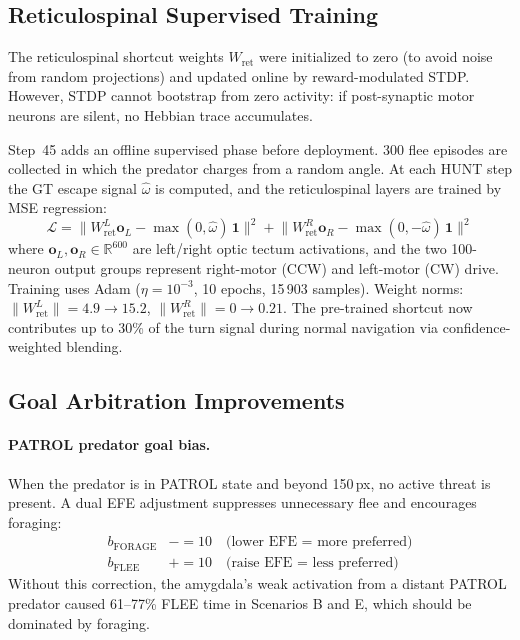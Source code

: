 \documentclass[11pt,a4paper]{article}
\begin{document}
\subsection{Reticulospinal Supervised Training}

The reticulospinal shortcut weights $W_\text{ret}$ were initialized to
zero (to avoid noise from random projections) and updated online by
reward-modulated STDP.  However, STDP cannot bootstrap from zero activity:
if post-synaptic motor neurons are silent, no Hebbian trace accumulates.

Step~45 adds an offline supervised phase before deployment.  300 flee
episodes are collected in which the predator charges from a random angle.
At each HUNT step the GT escape signal $\hat\omega$ is computed, and the
reticulospinal layers are trained by MSE regression:
\begin{equation}
  \mathcal{L} =
    \bigl\|W_\text{ret}^L \mathbf{o}_L - \max(0,\hat\omega)\,\mathbf{1}\bigr\|^2
  + \bigl\|W_\text{ret}^R \mathbf{o}_R - \max(0,-\hat\omega)\,\mathbf{1}\bigr\|^2
\end{equation}
where $\mathbf{o}_L, \mathbf{o}_R \in \mathbb{R}^{600}$ are left/right
optic tectum activations, and the two 100-neuron output groups represent
right-motor (CCW) and left-motor (CW) drive.  Training uses Adam
($\eta = 10^{-3}$, 10 epochs, 15\,903 samples).  Weight norms:
$\|W_\text{ret}^L\| = 4.9 \to 15.2$, $\|W_\text{ret}^R\| = 0 \to 0.21$.
The pre-trained shortcut now contributes up to 30\% of the turn signal
during normal navigation via confidence-weighted blending.

\subsection{Goal Arbitration Improvements}

\paragraph{PATROL predator goal bias.}
When the predator is in PATROL state and beyond 150\,px, no active
threat is present.  A dual EFE adjustment suppresses unnecessary flee
and encourages foraging:
\begin{align}
  b_\text{FORAGE} &\mathrel{{-}{=}} 10 \quad\text{(lower EFE = more preferred)} \\
  b_\text{FLEE}   &\mathrel{{+}{=}} 10 \quad\text{(raise EFE = less preferred)}
\end{align}
Without this correction, the amygdala's weak activation from a
distant PATROL predator caused 61--77\% FLEE time in Scenarios B and E,
which should be dominated by foraging.
\end{document}
